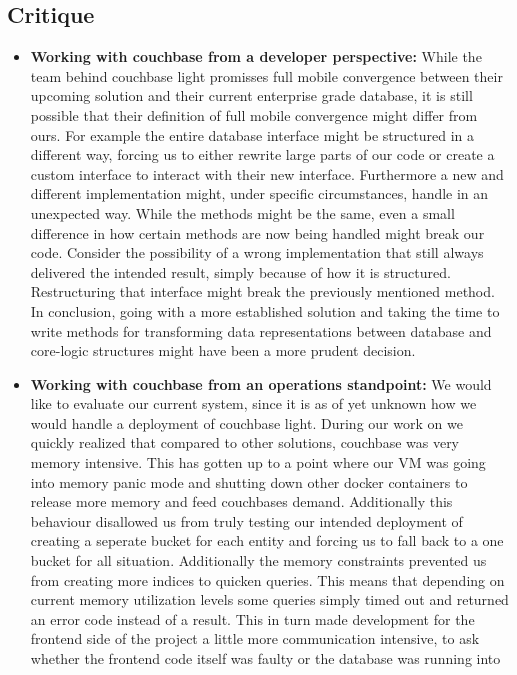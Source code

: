 \subsection{Critique}
\label{ssec:databaseEvalCrit}
\begin{itemize}
\item \label{db_crit_one} \textbf{Working with couchbase from a developer perspective:}
While the team behind couchbase light promisses full mobile convergence between their upcoming solution and their current enterprise grade database, it is still possible that their definition of full mobile convergence might differ from ours.
For example the entire database interface might be structured in a different way, forcing us to either rewrite large parts of our code or create a custom interface to interact with their new interface. Furthermore a new and different implementation might, under specific circumstances, handle in an unexpected way.
While the methods might be the same, even a small difference in how certain methods are now being handled might break our code. Consider the possibility of a wrong implementation that still always delivered the intended result, simply because of how it is structured. Restructuring that interface might break the previously mentioned method.
In conclusion, going with a more established solution and taking the time to write methods for transforming data representations between database and core-logic structures might have been a more prudent decision.
\item \label{db_crit_two} \textbf{Working with couchbase from an operations standpoint:}
We would like to evaluate our current system, since it is as of yet unknown how we would handle a deployment of couchbase light.
During our work on \projectName{} we quickly realized that compared to other solutions, couchbase was very memory intensive. This has gotten up to a point where our VM was going into memory panic mode and shutting down other docker containers to release more memory and feed couchbases demand.
Additionally this behaviour disallowed us from truly testing our intended deployment of creating a seperate bucket for each entity and forcing us to fall back to a one bucket for all situation. Additionally the memory constraints prevented us from creating more indices to quicken queries.
This means that depending on current memory utilization levels some queries simply timed out and returned an error code instead of a result. This in turn made development for the frontend side of the project a little more communication intensive, to ask whether the frontend code itself was faulty or the database was running into

\end{itemize}
